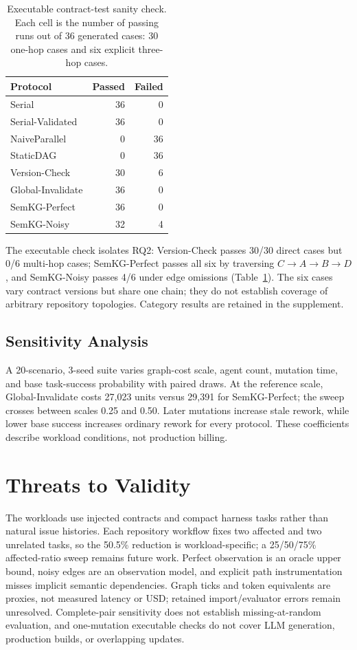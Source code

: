 \documentclass[a4paper,runningheads]{llncs}
\begin{document}
\begin{table}
\centering
\caption{Executable contract-test sanity check. Each cell is the number of passing runs out of 36 generated cases: 30 one-hop cases and six explicit three-hop cases.}
\label{tab:executable}
\small
\begin{tabular}{lrr}
\toprule
Protocol & Passed & Failed\\
\midrule
Serial & 36 & 0\\
Serial-Validated & 36 & 0\\
NaiveParallel & 0 & 36\\
StaticDAG & 0 & 36\\
Version-Check & 30 & 6\\
Global-Invalidate & 36 & 0\\
SemKG-Perfect & 36 & 0\\
SemKG-Noisy & 32 & 4\\
\bottomrule
\end{tabular}
\end{table}

The executable check isolates RQ2: Version-Check passes 30/30 direct cases but 0/6 multi-hop cases; SemKG-Perfect passes all six by traversing $C\rightarrow A\rightarrow B\rightarrow D$, and SemKG-Noisy passes 4/6 under edge omissions (Table~\ref{tab:executable}). The six cases vary contract versions but share one chain; they do not establish coverage of arbitrary repository topologies. Category results are retained in the supplement.


\subsection{Sensitivity Analysis}
A 20-scenario, 3-seed suite varies graph-cost scale, agent count, mutation time, and base task-success probability with paired draws. At the reference scale, Global-Invalidate costs 27,023 units versus 29,391 for SemKG-Perfect; the sweep crosses between scales 0.25 and 0.50. Later mutations increase stale rework, while lower base success increases ordinary rework for every protocol. These coefficients describe workload conditions, not production billing.

\section{Threats to Validity}
The workloads use injected contracts and compact harness tasks rather than natural issue histories. Each repository workflow fixes two affected and two unrelated tasks, so the 50.5\% reduction is workload-specific; a 25/50/75\% affected-ratio sweep remains future work. Perfect observation is an oracle upper bound, noisy edges are an observation model, and explicit path instrumentation misses implicit semantic dependencies. Graph ticks and token equivalents are proxies, not measured latency or USD; retained import/evaluator errors remain unresolved. Complete-pair sensitivity does not establish missing-at-random evaluation, and one-mutation executable checks do not cover LLM generation, production builds, or overlapping updates.
\end{document}
